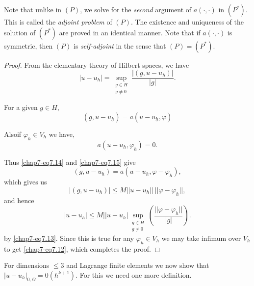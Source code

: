 \begin{remark}\label{chap7-rem7.2}
Note that unlike in $(P)$, we solve for the {\em second} argument of
$a(\cdot,\cdot)$ in $(P^{*})$. This is called the {\em adjoint
  problem} of $(P)$. The existence and uniqueness of the solution of
$(P^{*})$ are proved in an identical manner. Note that if
$a(\cdot,\cdot)$ is symmetric, then $(P)$ is {\em self-adjoint} in the
sense that $(P)=(P^{*})$.
\end{remark}

\begin{proof}
From the elementary theory of Hilbert spaces, we have
\begin{equation*}
|u-u_{h}|=\sup\limits_{\substack{g\in H\\ g\neq
    0}}\frac{|(g,u-u_{h})|}{|g|}.\tag{7.13}\label{chap7-eq7.13} 
\end{equation*}

For a given $g\in H$,
\begin{equation*}
(g,u-u_{\underline{h}})=a(u-u_{\underline{h}},\varphi)\tag{7.14}\label{chap7-eq7.14} 
\end{equation*}

Also\pageoriginale if $\varphi_{h}\in V_{h}$ we have,
\begin{equation*}
a(u-u_{h},\varphi_{h})=0.\tag{7.15}\label{chap7-eq7.15}
\end{equation*}

Thus \eqref{chap7-eq7.14} and \eqref{chap7-eq7.15} give
\begin{equation*}
(g,u-u_{h})=a(u-u_{h},\varphi-\varphi_{h}),\tag{7.16}\label{chap7-eq7.16} 
\end{equation*}
which gives us
$$
|(g,u-u_{h})|\leq M||u-u_{h}||~||\varphi-\varphi_{h}||,
$$
and hence
$$
|u-u_{h}|\leq M||u-u_{h}|\sup\limits_{\substack{g\in H\\ g\neq
    0}}\left(\frac{||\varphi-\varphi_{h}||}{|g|}\right). 
$$
by \eqref{chap7-eq7.13}. Since this is true for any $\varphi_{h}\in
V_{h}$ we may take infimum over $V_{h}$ to get \eqref{chap7-eq7.12},
which completes the proof.
\end{proof}

For dimensions $\leq 3$ and Lagrange finite elements we now show that
$|u-u_{h}|_{0,\Omega}=0(h^{k+1})$. For this we need one more
definition.

